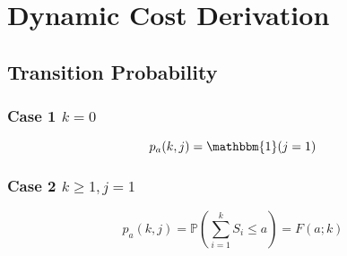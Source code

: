 \chapter{Dynamic Cost Derivation}

\section{Transition Probability}
\subsection{Case 1 $k = 0$}
\begin{equation*}
	p_{a} (k, j) = \mathbbm{1} (j = 1)
\end{equation*}

\subsection{Case 2 $k \geq 1, j = 1$}
\begin{equation*}
	p_{a} (k, j) = \mathbb{P} \left( \sum_{i = 1}^{k} S_{i} \leq a \right) = F (a; k)
\end{equation*}

